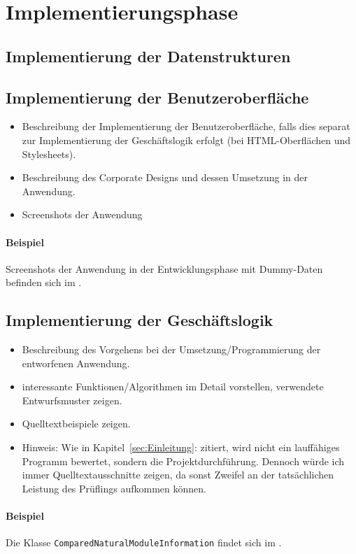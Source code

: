 \section{Implementierungsphase} 
\label{sec:Implementierungsphase}

\subsection{Implementierung der Datenstrukturen}
\label{sec:ImplementierungDatenstrukturen}



\subsection{Implementierung der Benutzeroberfläche}
\label{sec:ImplementierungBenutzeroberflaeche}

\begin{itemize}
	\item Beschreibung der Implementierung der Benutzeroberfläche, falls dies separat zur Implementierung der Geschäftslogik erfolgt (\zB bei \acs{HTML}-Oberflächen und Stylesheets).
	\item \Ggfs Beschreibung des Corporate Designs und dessen Umsetzung in der Anwendung.
	\item Screenshots der Anwendung
\end{itemize}

\paragraph{Beispiel}
Screenshots der Anwendung in der Entwicklungsphase mit Dummy-Daten befinden sich im .


\subsection{Implementierung der Geschäftslogik}
\label{sec:ImplementierungGeschaeftslogik}

\begin{itemize}
	\item Beschreibung des Vorgehens bei der Umsetzung/Programmierung der entworfenen Anwendung.
	\item \Ggfs interessante Funktionen/Algorithmen im Detail vorstellen, verwendete Entwurfsmuster zeigen.
	\item Quelltextbeispiele zeigen.
	\item Hinweis: Wie in Kapitel~\ref{sec:Einleitung}:  zitiert, wird nicht ein lauffähiges Programm bewertet, sondern die Projektdurchführung. Dennoch würde ich immer Quelltextausschnitte zeigen, da sonst Zweifel an der tatsächlichen Leistung des Prüflings aufkommen können.
\end{itemize}

\paragraph{Beispiel}
Die Klasse \texttt{Com\-par\-ed\-Na\-tu\-ral\-Mo\-dule\-In\-for\-ma\-tion} findet sich im .  
